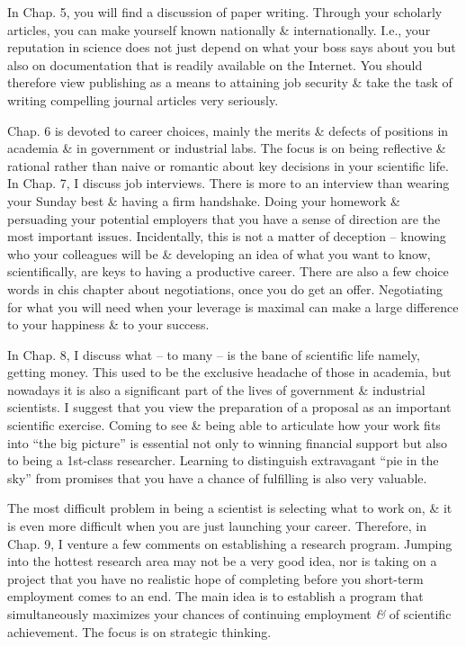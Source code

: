 \documentclass{article}
\begin{document}
\begin{enumerate}
\begin{itemize}
		In Chap. 5, you will find a discussion of paper writing. Through your scholarly articles, you can make yourself known nationally \& internationally. I.e., your reputation in science does not just depend on what your boss says about you but also on documentation that is readily available on the Internet. You should therefore view publishing as a means to attaining job security \& take the task of writing compelling journal articles very seriously.
		
		Chap. 6 is devoted to career choices, mainly the merits \& defects of positions in academia \& in government or industrial labs. The focus is on being reflective \& rational rather than naive or romantic about key decisions in your scientific life. In Chap. 7, I discuss job interviews. There is more to an interview than wearing your Sunday best \& having a firm handshake. Doing your homework \& persuading your potential employers that you have a sense of direction are the most important issues. Incidentally, this is not a matter of deception -- knowing who your colleagues will be \& developing an idea of what you want to know, scientifically, are keys to having a productive career. There are also a few choice words in chis chapter about negotiations, once you do get an offer. Negotiating for what you will need when your leverage is maximal can make a large difference to your happiness \& to your success.
		
		In Chap. 8, I discuss what -- to many -- is the bane of scientific life namely, getting money. This used to be the exclusive headache of those in academia, but nowadays it is also a significant part of the lives of government \& industrial scientists. I suggest that you view the preparation of a proposal as an important scientific exercise. Coming to see \& being able to articulate how your work fits into ``the big picture'' is essential not only to winning financial support but also to being a 1st-class researcher. Learning to distinguish extravagant ``pie in the sky'' from promises that you have a chance of fulfilling is also very valuable.
		
		The most difficult problem in being a scientist is selecting what to work on, \& it is even more difficult when you are just launching your career. Therefore, in Chap. 9, I venture a few comments on establishing a research program. Jumping into the hottest research area may not be a very good idea, nor is taking on a project that you have no realistic hope of completing before you short-term employment comes to an end. The main idea is to establish a program that simultaneously maximizes your chances of continuing employment {\it\&} of scientific achievement. The focus is on strategic thinking.
		

\end{itemize}
\end{enumerate}
\end{document}
